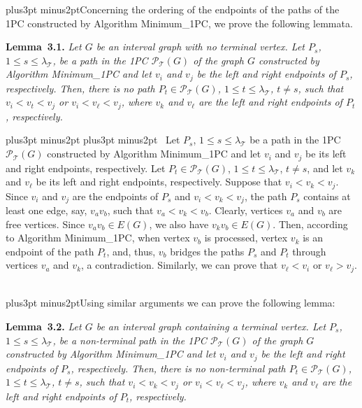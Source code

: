 \documentclass[10pt]{article}
\def\yskip{\penalty-50\vskip3pt plus3pt minus2pt}
\def\y{\yskip}
\def\yy{\yskip\yskip}
\def\qed{\hskip 3pt\vrule height 6pt width 3pt depth 0pt}
\def\s{\ }
\begin{document}
{\y Concerning the ordering of the endpoints of the paths of the
1PC constructed by Algorithm Minimum\_1PC, we prove the following
lemmata.

\medskip
\par\noindent
{\bf Lemma~3.1.} {\it Let $G$ be an interval graph with no
terminal vertex. Let $P_s$, $1 \leq s \leq \lambda_\mathcal{T}$,
be a path in the 1PC $\mathcal{P_{\mathcal{T}}}(G)$ of the graph
$G$ constructed by Algorithm Minimum\_1PC and let $v_i$ and $v_j$
be the left and right endpoints of $P_s$, respectively. Then,
there is no path $P_t \in \mathcal{P_{\mathcal{T}}}(G)$, $1 \leq t
\leq \lambda_\mathcal{T}$, $t\neq s$, such that $v_i<v_t<v_j$ or
$v_i<v_\ell<v_j$, where $v_k$ and $v_\ell$ are the left and right
endpoints of $P_t$, respectively.}

\yy {} \s Let $P_s$, $1 \leq s \leq
\lambda_\mathcal{T}$ be a path in the 1PC
$\mathcal{P_{\mathcal{T}}}(G)$ constructed by Algorithm
Minimum\_1PC and let $v_i$ and $v_j$ be its left and right
endpoints, respectively. Let $P_t \in
\mathcal{P_{\mathcal{T}}}(G)$, $1 \leq t \leq
\lambda_\mathcal{T}$, $t\neq s$, and let $v_k$ and $v_\ell$ be its
left and right endpoints, respectively. Suppose that
$v_i<v_k<v_j$. Since $v_i$ and $v_j$ are the endpoints of $P_s$
and $v_i<v_k<v_j$, the path $P_s$ contains at least one edge, say,
$v_av_b$, such that $v_a<v_k<v_b$. Clearly, vertices $v_a$ and
$v_b$ are free vertices. Since $v_av_b \in E(G)$, we also have
$v_kv_b \in E(G)$. Then, according to Algorithm Minimum\_1PC, when
vertex $v_b$ is processed, vertex $v_k$ is an endpoint of the path
$P_t$, and, thus, $v_b$ bridges the paths $P_s$ and $P_t$ through
vertices $v_a$ and $v_k$, a contradiction. Similarly, we can prove
that $v_\ell<v_i$ or $v_\ell>v_j$. \ \qed

\y Using similar arguments we can prove the following lemma:

\medskip
\par\noindent
{\bf Lemma~3.2.} {\it Let $G$ be an interval graph containing a
terminal vertex. Let $P_s$, $1 \leq s \leq \lambda_\mathcal{T}$,
be a non-terminal path in the 1PC $\mathcal{P_{\mathcal{T}}}(G)$
of the graph $G$ constructed by Algorithm Minimum\_1PC and let
$v_i$ and $v_j$ be the left and right endpoints of $P_s$,
respectively. Then, there is no non-terminal path $P_t \in
\mathcal{P_{\mathcal{T}}}(G)$, $1 \leq t \leq
\lambda_\mathcal{T}$, $t\neq s$, such that $v_i<v_k<v_j$ or
$v_i<v_\ell<v_j$, where $v_k$ and $v_\ell$ are the left and right
endpoints of $P_t$, respectively.}


}
\end{document}
